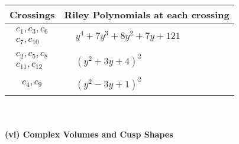 \documentclass[1p]{elsarticle_modified}
\theoremstyle{definition}
\begin{document}
\begin{tabular}{m{50pt}|m{274pt}}
Crossings & \hspace{64pt}Riley Polynomials at each crossing \\
\hline $$\begin{aligned}c_{1},c_{3},c_{6}\\c_{7},c_{10}\end{aligned}$$&$\begin{aligned}
&y^4+7 y^3+8 y^2+7 y+121
\end{aligned}$\\
\hline $$\begin{aligned}c_{2},c_{5},c_{8}\\c_{11},c_{12}\end{aligned}$$&$\begin{aligned}
&(y^2+3 y+4)^2
\end{aligned}$\\
\hline $$\begin{aligned}c_{4},c_{9}\end{aligned}$$&$\begin{aligned}
&(y^2-3 y+1)^2
\end{aligned}$\\
\hline
\end{tabular}\\~\\
\newpage\flushleft \textbf{(vi) Complex Volumes and Cusp Shapes}
\end{document}
